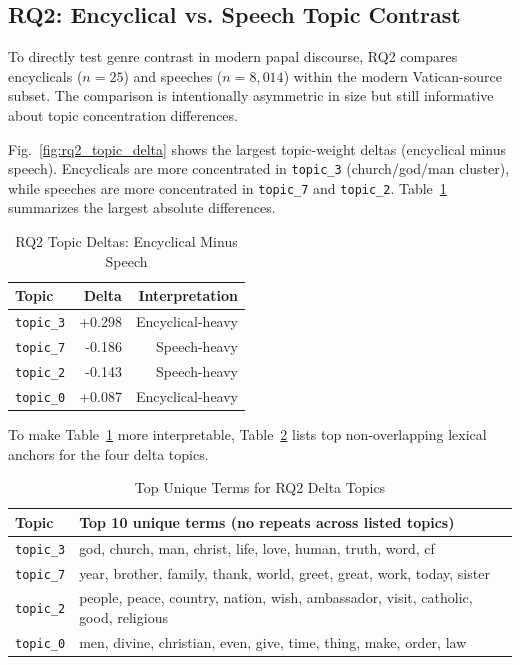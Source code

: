\documentclass[conference]{IEEEtran}
\begin{document}
\subsection{RQ2: Encyclical vs. Speech Topic Contrast}
To directly test genre contrast in modern papal discourse, RQ2 compares encyclicals ($n=25$) and speeches ($n=8{,}014$) within the modern Vatican-source subset. The comparison is intentionally asymmetric in size but still informative about topic concentration differences.

Fig.~\ref{fig:rq2_topic_delta} shows the largest topic-weight deltas (encyclical minus speech). Encyclicals are more concentrated in \texttt{topic\_3} (church/god/man cluster), while speeches are more concentrated in \texttt{topic\_7} and \texttt{topic\_2}. Table~\ref{tab:rq2_topic_delta} summarizes the largest absolute differences.

\begin{table}[htbp]
\caption{RQ2 Topic Deltas: Encyclical Minus Speech}
\label{tab:rq2_topic_delta}
\centering
\begin{tabular}{lrr}
\toprule
Topic & Delta & Interpretation \\
\midrule
\texttt{topic\_3} & +0.298 & Encyclical-heavy \\
\texttt{topic\_7} & -0.186 & Speech-heavy \\
\texttt{topic\_2} & -0.143 & Speech-heavy \\
\texttt{topic\_0} & +0.087 & Encyclical-heavy \\
\bottomrule
\end{tabular}
\end{table}

To make Table~\ref{tab:rq2_topic_delta} more interpretable, Table~\ref{tab:rq2_topic_terms} lists top non-overlapping lexical anchors for the four delta topics.

\begin{table}[htbp]
\caption{Top Unique Terms for RQ2 Delta Topics}
\label{tab:rq2_topic_terms}
\centering
\footnotesize
\begin{tabular}{lp{}}
\toprule
Topic & Top 10 unique terms (no repeats across listed topics) \\
\midrule
\texttt{topic\_3} & god, church, man, christ, life, love, human, truth, word, cf \\
\texttt{topic\_7} & year, brother, family, thank, world, greet, great, work, today, sister \\
\texttt{topic\_2} & people, peace, country, nation, wish, ambassador, visit, catholic, good, religious \\
\texttt{topic\_0} & men, divine, christian, even, give, time, thing, make, order, law \\
\bottomrule
\end{tabular}
\end{table}
\end{document}
